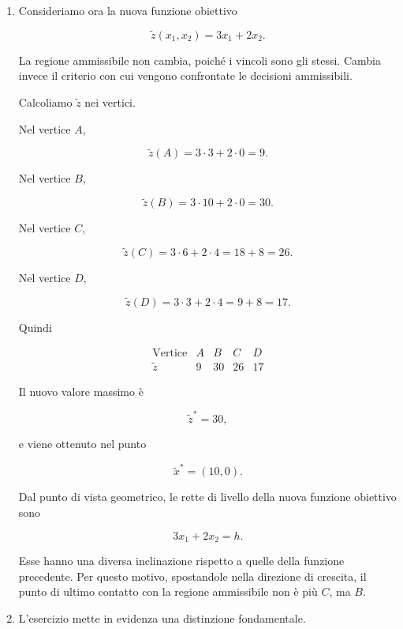 \begin{enumerate}
Esso non \`e quindi attivo.

Anche i vincoli di non negativit\`a non sono attivi, poich\'e

\[
x_1^*=6>0,
\qquad
x_2^*=4>0.
\]

La soluzione ottima \`e dunque determinata dall'intersezione dei due vincoli

\[
x_1+x_2=10
\qquad
\mbox{e}
\qquad
x_2=4.
\]

\item Consideriamo ora la nuova funzione obiettivo

\[
\widetilde z(x_1,x_2)=3x_1+2x_2.
\]

La regione ammissibile non cambia, poich\'e i vincoli sono gli stessi. Cambia
invece il criterio con cui vengono confrontate le decisioni ammissibili.

Calcoliamo \(\widetilde z\) nei vertici.

Nel vertice \(A\),

\[
\widetilde z(A)=3\cdot3+2\cdot0=9.
\]

Nel vertice \(B\),

\[
\widetilde z(B)=3\cdot10+2\cdot0=30.
\]

Nel vertice \(C\),

\[
\widetilde z(C)=3\cdot6+2\cdot4=18+8=26.
\]

Nel vertice \(D\),

\[
\widetilde z(D)=3\cdot3+2\cdot4=9+8=17.
\]

Quindi

\[
\begin{array}{c|cccc}
\text{Vertice}
&
A
&
B
&
C
&
D
\\
\hline
\widetilde z
&
9
&
30
&
26
&
17
\end{array}
\]

Il nuovo valore massimo \`e

\[
\widetilde z^*=30,
\]

e viene ottenuto nel punto

\[
\widetilde x^*=(10,0).
\]

Dal punto di vista geometrico, le rette di livello della nuova funzione
obiettivo sono

\[
3x_1+2x_2=h.
\]

Esse hanno una diversa inclinazione rispetto a quelle della funzione
precedente. Per questo motivo, spostandole nella direzione di crescita, il
punto di ultimo contatto con la regione ammissibile non \`e pi\`u \(C\), ma
\(B\).

\item L'esercizio mette in evidenza una distinzione fondamentale.


\end{enumerate}
